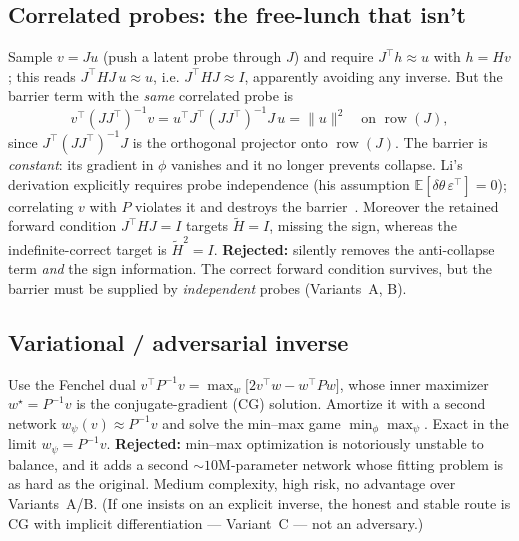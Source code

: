 \documentclass[11pt]{article}
\theoremstyle{plain}
\theoremstyle{definition}
\theoremstyle{remark}
\DeclareMathOperator{\row}{row}
\newcommand{\E}{\mathbb{E}}
\newcommand{\norm}[1]{\lVert #1 \rVert}
\newcommand{\tHess}{\tilde{H}}
\begin{document}
\subsection{Correlated probes: the free-lunch that isn't}
\label{sub:correlated}
Sample $v=Ju$ (push a latent probe through $J$) and require $J^{\!\top}h\approx u$ with
$h=Hv$; this reads $J^{\!\top}HJ\,u\approx u$, i.e. $J^{\!\top}HJ\approx I$, apparently
avoiding any inverse. But the barrier term with the \emph{same} correlated probe is
\begin{equation}
  v^{\!\top}(JJ^{\!\top})^{-1}v = u^{\!\top}J^{\!\top}(JJ^{\!\top})^{-1}J\,u = \norm{u}^2
  \quad\text{on }\row(J),
\end{equation}
since $J^{\!\top}(JJ^{\!\top})^{-1}J$ is the orthogonal projector onto $\row(J)$. The
barrier is \emph{constant}: its gradient in $\phi$ vanishes and it no longer prevents
collapse. Li's derivation explicitly requires probe independence (his assumption
$\E[\delta\theta\,\varepsilon^{\!\top}]=0$); correlating $v$ with $P$ violates it and
destroys the barrier~\cite{li2015}. Moreover the retained forward condition $J^{\!\top}HJ=I$
targets $\tHess=I$, missing the sign, whereas the indefinite-correct target is
$\tHess^2=I$. \textbf{Rejected:} silently removes the anti-collapse term \emph{and} the sign
information. The correct forward condition survives, but the barrier must be supplied by
\emph{independent} probes (Variants~A, B).

\subsection{Variational / adversarial inverse}
\label{sub:gan}
Use the Fenchel dual $v^{\!\top}P^{-1}v=\max_w\big[2v^{\!\top}w-w^{\!\top}Pw\big]$, whose
inner maximizer $w^\star=P^{-1}v$ is the conjugate-gradient (CG) solution. Amortize it with
a second network $w_\psi(v)\approx P^{-1}v$ and solve the min--max game
$\min_\phi\max_\psi$. Exact in the limit $w_\psi=P^{-1}v$. \textbf{Rejected:} min--max
optimization is notoriously unstable to balance, and it adds a second $\sim\!10$M-parameter
network whose fitting problem is as hard as the original. Medium complexity, high risk, no
advantage over Variants~A/B. (If one insists on an explicit inverse, the honest and stable
route is CG with implicit differentiation --- Variant~C --- not an adversary.)

\end{document}
